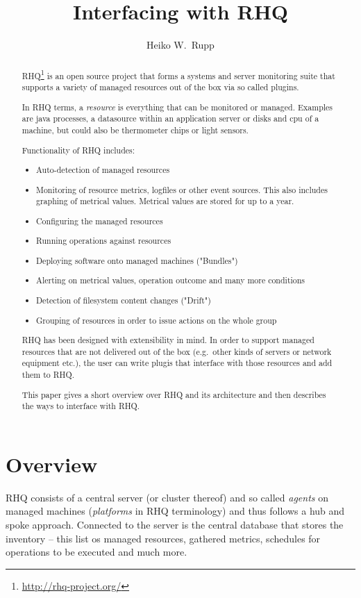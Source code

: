 \documentclass[twocolumn,10pt,a4paper]{article}
\title{Interfacing with RHQ}
\author{Heiko W.\ Rupp}
\begin{document}
\sloppy
\maketitle



\begin{abstract}
RHQ\footnote{\url{http://rhq-project.org/}} is an open source project that forms a systems and server monitoring
suite that supports a variety of managed
resources out of the box via so called plugins. 

In RHQ terms, a \emph{resource} 
is everything that can be monitored or managed. Examples are java processes, a datasource within an application server or disks and cpu of a machine, but could also be thermometer chips or light sensors.

Functionality of RHQ includes:
\begin{itemize}
\item Auto-detection of managed resources
\item Monitoring of resource metrics, logfiles or other event sources. This also includes graphing of metrical values. Metrical values are stored for up to a year.
\item Configuring the managed resources
\item Running operations against resources
\item Deploying software onto managed machines ("Bundles")
\item Alerting on metrical values, operation outcome and many more conditions
\item Detection of filesystem content changes ("Drift")
\item Grouping of resources in order to issue actions on the whole group
\end{itemize}

RHQ has been designed with extensibility in mind. 
In order to support managed resources that are not delivered out of the box 
(e.g.\ other kinds of servers or network equipment etc.), 
the user can write plugis that interface with those resources and add them to RHQ.

This paper gives a short overview over RHQ and its architecture and then
describes the ways to interface with RHQ.
\end{abstract}

\section{Overview}
RHQ consists of a central server (or cluster thereof) and so called
\emph{agents} on managed machines (\emph{platforms} in RHQ terminology) and thus
follows a hub and spoke approach. Connected to the server is the central
database that stores the inventory -- this list os managed resources, gathered
metrics, schedules for operations to be executed and much more.
\end{document}
